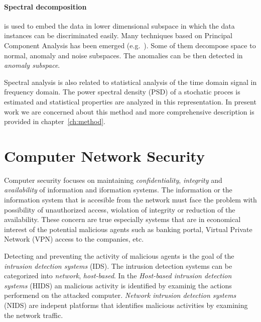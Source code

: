 \paragraph*{Spectral decomposition} is used to embed the data in lower dimensional subspace in which the data 
instances can be discriminated easily. Many techniques based on Principal Component Analysis has been emerged 
(e.g.~\cite{ringberg2007sensitivity}). Some of them decompose space to normal, anomaly and noise subspaces.
The anomalies can be then detected in \emph{anomaly subspace}. 

Spectral analysis is also related to statistical analysis of the time domain signal in frequency domain.
The power spectral density (PSD) of a stochatic proces is estimated and statistical properties are 
analyzed in this representation. In present work we are concerned about this method and more comprehensive
description is provided in chapter~\ref{ch:method}.




\section{Computer Network Security}

Computer security focuses on maintaining \emph{confidentiality}, \emph{integrity} and \emph{availability} of information
and iformation systems. The information or the information system that is accesible from the network must face the
problem with possibility of unauthorized access, wiolation of integrity or reduction of the availability.
These concern are true especially systems that are in economical interest of the potential malicious agents
such as banking portal, Virtual Private Network (VPN) access to the companies, etc. 

Detecting and preventing the activity of malicious agents is the goal of the \emph{intrusion detection systems} (IDS).
The intrusion detection systems can be categorized into \emph{network}, \emph{host-based}.
In the \emph{Host-based intrusion detection systems} (HIDS) an malicious activity is identified by examinig the 
actions performend on the attacked computer.
\emph{Network intrusion detection systems} (NIDS) are indepent platforms that identifies malicious activities by examining 
the network traffic.

